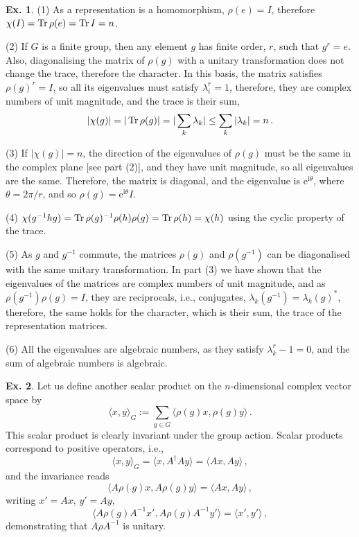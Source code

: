 \documentclass[a4paper,12pt]{article}
\def\e{\mathrm{e}}
\def\imagi{\mathrm{i}}
\def\Tr{\ensuremath{\mathop{\rm Tr}}{}}
\theoremstyle{definition}
\newtheorem{exercise}{Ex.}[section]
\begin{document}
\begin{exercise}
 (1) As a representation is a homomorphism, $\rho(e)=I$, therefore $\chi(I)=\Tr \rho(e)=\Tr I=n$.
 
 (2) If $G$ is a finite group, then any element $g$ has finite order, $r$, such that $g^r=e$. Also, diagonalising the matrix of $\rho(g)$ with a unitary transformation does not change the trace, therefore the character. In this basis, the matrix satisfies $\rho(g)^r=I$, so all its eigenvalues must satisfy $\lambda_i^r=1$, therefore, they are complex numbers of unit magnitude, and the trace is their sum,
 \[
  |\chi(g)| = |\Tr \rho(g)| = |\sum_{k}\lambda_k| \le \sum_k |\lambda_k| = n\,.
 \]
 
 (3) If $|\chi(g)|=n$, the direction of the eigenvalues of $\rho(g)$ must be the same in the complex plane [see part (2)], and they have unit magnitude, so all eigenvalues are the same. Therefore, the matrix is diagonal, and the eigenvalue is $\e^{\imagi \theta}$, where $\theta=2\pi/r$, and so $\rho(g)=\e^{\imagi \theta}I$.

 (4) $\chi(g^{-1}hg) = \Tr \rho(g)^{-1} \rho(h) \rho(g) = \Tr \rho(h)=\chi(h)$ using the cyclic property of the trace.
 
 (5) As $g$ and $g^{-1}$ commute, the matrices $\rho(g)$ and $\rho(g^{-1})$ can be diagonalised with the same unitary transformation. In part (3) we have shown that the eigenvalues of the matrices are complex numbers of unit magnitude, and as $\rho(g^{-1})\rho(g)=I$, they are reciprocals, i.e., conjugates, $\lambda_k(g^{-1})=\lambda_k(g)^*$, therefore, the same holds for the character, which is their sum, the trace of the representation matrices.
 
 (6) All the eigenvalues are algebraic numbers, as they satisfy $\lambda_k^r - 1=0$, and the sum of algebraic numbers is algebraic.
\end{exercise}

\begin{exercise}
 Let us define another scalar product on the $n$-dimensional complex vector space by
 \[
  \langle x, y\rangle_G := \sum_{g\in G} \langle \rho(g) x, \rho(g) y\rangle\,.
 \]
 This scalar product is clearly invariant under the group action. Scalar products correspond to positive operators, i.e.,
 \[
  \langle x, y\rangle_G = \langle x, A^\dagger A y\rangle = \langle Ax, Ay\rangle\,,
 \]
 and the invariance reads
 \[
  \langle A\rho(g) x,  A \rho(g) y\rangle = \langle A x, A y\rangle\,,
 \]
 writing $x'=Ax$, $y'=Ay$,
 \[
  \langle A \rho(g) A^{-1}x', A\rho(g)A^{-1} y'\rangle = \langle x', y'\rangle\,,
 \]
 demonstrating that $A\rho A^{-1}$ is unitary.
\end{exercise}
\end{document}

